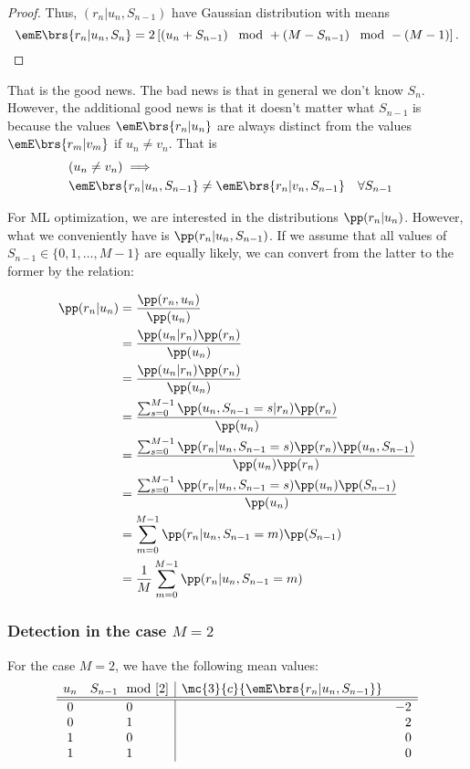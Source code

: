 \begin{proof}
Thus, $(r_n|u_n,S_{n-1})$ have Gaussian distribution with means
\[ \emE\brs{r_n|u_n,S_n} =  2\left[
           \left( u_n + S_{n-1} \right)\mod + \left( M   - S_{n-1}\right)\mod
           - (M - 1) \right]. \]
\end{proof}

That is the good news.
The bad news is that in general we don't know $S_n$.
However, the additional good news is that it doesn't matter what
$S_{n-1}$ is because the values $\emE\brs{r_n|u_n}$ are
always distinct from the values $\emE\brs{r_m|v_m}$
if $u_n\ne v_n$.
That is
\begin{align*}
   & (u_n\ne v_n)\implies
 \\&
   \emE\brs{r_n|u_n,S_{n-1}} \ne \emE\brs{r_n|v_n,S_{n-1}}
   && \forall S_{n-1}
\end{align*}

For ML optimization, we are interested in the distributions
$\pp(r_n|u_n)$.
However, what we conveniently have is $\pp(r_n|u_n,S_{n-1})$.
If we assume that all values of $S_{n-1}\in\{0,1,\ldots,M-1\}$
are equally likely, we can convert from the latter to the
former by the relation:

\begin{align*}
   \pp(r_n|u_n)
      &= \frac{\pp(r_n,u_n)}{\pp(u_n)}
    \\&= \frac{\pp(u_n|r_n)\pp(r_n)}
              {\pp(u_n)}
    \\&= \frac{\pp(u_n|r_n)\pp(r_n)}
              {\pp(u_n)}
    \\&= \frac{\sum_{s=0}^{M-1}\pp(u_n,S_{n-1}=s|r_n)\pp(r_n)}
              {\pp(u_n)}
    \\&= \frac{\sum_{s=0}^{M-1}\pp(r_n|u_n,S_{n-1}=s)\pp(r_n)\pp(u_n,S_{n-1})}
              {\pp(u_n)\pp(r_n)}
    \\&= \frac{\sum_{s=0}^{M-1}\pp(r_n|u_n,S_{n-1}=s)\pp(u_n)\pp(S_{n-1})}
              {\pp(u_n)}
    \\&= \sum_{m=0}^{M-1}\pp(r_n|u_n,S_{n-1}=m)\pp(S_{n-1})
    \\&= \frac{1}{M}\sum_{m=0}^{M-1}\pp(r_n|u_n,S_{n-1}=m)
\end{align*}

\subsubsection{Detection in the case $M=2$}
For the case $M=2$, we have the following mean values:
\[
\begin{array}{cc|rrr}
   u_n & S_{n-1}\mod[2] & \mc{3}{c}{\emE\brs{r_n|u_n,S_{n-1}}} \\
   \hline
   \hline
   0 & 0 && -2 \\
   0 & 1 &&  2 \\
   1 & 0 &&  0 \\
   1 & 1 &&  0
\end{array}
\]

